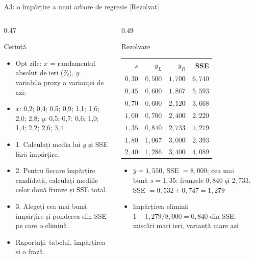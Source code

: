 \begin{frame}{A3: o împărțire a unui arbore de regresie [Rezolvat]}
\itemsize{\scriptsize}
\begin{columns}[T]
\begin{column}{0.47\textwidth}
\begin{block}{Cerință}
\begin{itemize}
    \item Opt zile: $x$ = randamentul absolut de ieri (\%), $y$ = variabila proxy a varianței de azi:
    \item $x$: 0,2; 0,4; 0,5; 0,9; 1,1; 1,6; 2,0; 2,8; $y$: 0,5; 0,7; 0,6; 1,0; 1,4; 2,2; 2,6; 3,4
    \item 1. Calculați media lui $y$ și SSE fără împărțire.
    \item 2. Pentru fiecare împărțire candidată, calculați mediile celor două frunze și SSE total.
    \item 3. Alegeți cea mai bună împărțire și ponderea din SSE pe care o elimină.
    \item Raportați: tabelul, împărțirea și o frază.
\end{itemize}
\end{block}
\end{column}
\begin{column}{0.49\textwidth}
\begin{exampleblock}{Rezolvare}
\begin{center}
\tiny
\begin{tabular}{rrrr}
\toprule
$s$ & $\bar y_L$ & $\bar y_R$ & SSE \\
\midrule
$0{,}30$ & $0{,}500$ & $1{,}700$ & $6{,}740$ \\
$0{,}45$ & $0{,}600$ & $1{,}867$ & $5{,}593$ \\
$0{,}70$ & $0{,}600$ & $2{,}120$ & $3{,}668$ \\
$1{,}00$ & $0{,}700$ & $2{,}400$ & $2{,}220$ \\
$1{,}35$ & $0{,}840$ & $2{,}733$ & $1{,}279$ \\
$1{,}80$ & $1{,}067$ & $3{,}000$ & $2{,}393$ \\
$2{,}40$ & $1{,}286$ & $3{,}400$ & $4{,}089$ \\
\bottomrule
\end{tabular}
\end{center}
\begin{itemize}
    \item $\bar y = 1{,}550$, SSE $= 8{,}000$; cea mai bună $s = 1{,}35$: frunzele $0{,}840$ și $2{,}733$, SSE $= 0{,}532 + 0{,}747 = 1{,}279$
    \item împărțirea elimină $1 - 1{,}279/8{,}000 = 0{,}840$ din SSE: mișcări mari ieri, varianță mare azi
\end{itemize}
\end{exampleblock}
\end{column}
\end{columns}
\end{frame}

